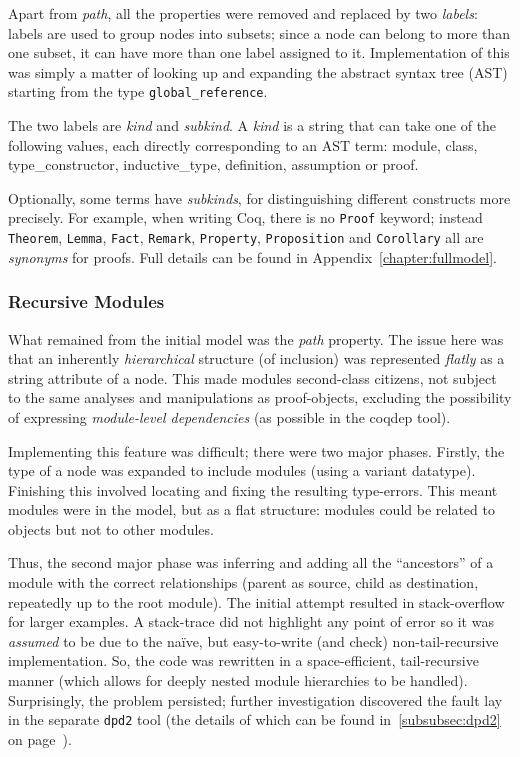 Apart from \emph{path}, all the properties were removed and replaced by two
\emph{labels}: labels are used to group  nodes into subsets; since a node can
belong to more than one subset, it can have more than one label assigned to it.
Implementation of this was simply a matter of looking up and expanding the
abstract syntax tree (AST) starting from the type \texttt{global\_reference}.

The two labels are \emph{kind} and \emph{subkind}.  A \emph{kind} is a string
that can take one of the following values, each directly corresponding to an
AST term: \textsf{module}, \textsf{class}, \textsf{type\_constructor},
\textsf{inductive\_type}, \textsf{definition}, \textsf{assumption} or
\textsf{proof}.

Optionally, some terms have \emph{subkinds}, for distinguishing different
constructs more precisely. For example, when writing Coq, there is no
\texttt{Proof} keyword; instead \texttt{Theorem}, \texttt{Lemma}, \texttt{Fact},
\texttt{Remark}, \texttt{Property}, \texttt{Proposition} and \texttt{Corollary}
all are \emph{synonyms} for proofs. Full details can be found in
Appendix~\ref{chapter:fullmodel}.

\subsubsection{Recursive Modules}\label{subsubsec:recmodules}

What remained from the initial model was the \emph{path} property. The issue
here was that an inherently \emph{hierarchical} structure (of inclusion) was
represented \emph{flatly} as a string attribute of a node. This made modules
second-class citizens, not subject to the same analyses and manipulations as
proof-objects, excluding the possibility of expressing \emph{module-level
dependencies} (as possible in the coqdep tool).

Implementing this feature was difficult; there were two major phases. Firstly,
the type of a node was expanded to include modules (using a variant datatype).
Finishing this involved locating and fixing the resulting type-errors. This
meant modules were in the model, but as a flat structure: modules could be
related to objects but not to other modules.

Thus, the second major phase was inferring and adding all the ``ancestors'' of a
module with the correct relationships (parent as source, child as destination,
repeatedly up to the root module). The initial attempt resulted in
stack-overflow for larger examples. A stack-trace did not highlight any point of
error so it was \emph{assumed} to be due to the na\"{i}ve, but easy-to-write
(and check) non-tail-recursive implementation. So, the code was rewritten in a
space-efficient, tail-recursive manner (which allows for deeply nested module
hierarchies to be handled). Surprisingly, the problem persisted; further
investigation discovered the fault lay in the separate \texttt{dpd2} tool (the
details of which can be found in~\ref{subsubsec:dpd2} on
page~\pageref{subsubsec:dpd2}).


